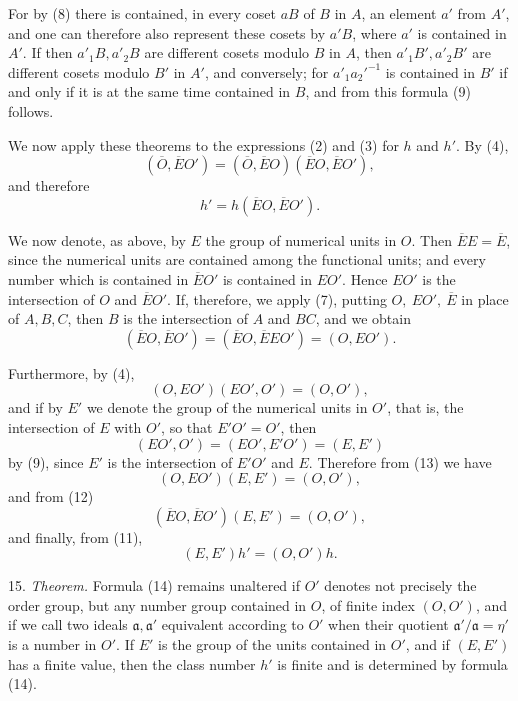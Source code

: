 \documentclass[11pt]{article}
\begin{document}
For by (8) there is contained, in every coset \(aB\) of \(B\) in \(A\), an element \(a'\) from \(A'\), and one can therefore also represent these cosets by \(a'B\), where \(a'\) is contained in \(A'\). If then \(a'_1B,a'_2B\) are different cosets modulo \(B\) in \(A\), then \(a'_1B',a'_2B'\) are different cosets modulo \(B'\) in \(A'\), and conversely; for \(a'_1a_2'^{-1}\) is contained in \(B'\) if and only if it is at the same time contained in \(B\), and from this formula (9) follows.

We now apply these theorems to the expressions (2) and (3) for \(h\) and \(h'\). By (4),
\begin{equation}
 (\overline O,\overline EO')=(\overline O,\overline EO)(\overline EO,\overline EO'),
\tag{10}
\end{equation}
and therefore
\begin{equation}
 h'=h(\overline EO,\overline EO').
\tag{11}
\end{equation}

We now denote, as above, by \(E\) the group of numerical units in \(O\). Then \(\overline EE=\overline E\), since the numerical units are contained among the functional units; and every number which is contained in \(\overline EO'\) is contained in \(EO'\). Hence \(EO'\) is the intersection of \(O\) and \(\overline EO'\). If, therefore, we apply (7), putting \(O,\ EO',\ \overline E\) in place of \(A,B,C\), then \(B\) is the intersection of \(A\) and \(BC\), and we obtain
\begin{equation}
 (\overline EO,\overline EO')=(\overline EO,\overline EEO')=(O,EO').
\tag{12}
\end{equation}

Furthermore, by (4),
\begin{equation}
 (O,EO')(EO',O')=(O,O'),
\tag{13}
\end{equation}
and if by \(E'\) we denote the group of the numerical units in \(O'\), that is, the intersection of \(E\) with \(O'\), so that \(E'O'=O'\), then
\[
 (EO',O')=(EO',E'O')=(E,E')
\]
by (9), since \(E'\) is the intersection of \(E'O'\) and \(E\). Therefore from (13) we have
\[
 (O,EO')(E,E')=(O,O'),
\]
and from (12)
\[
 (\overline EO,\overline EO')(E,E')=(O,O'),
\]
and finally, from (11),
\begin{equation}
 (E,E')h'=(O,O')h.
\tag{14}
\end{equation}

15. \emph{Theorem.} Formula (14) remains unaltered if \(O'\) denotes not precisely the order group, but any number group contained in \(O\), of finite index \((O,O')\), and if we call two ideals \(\mathfrak a,\mathfrak a'\) equivalent according to \(O'\) when their quotient \(\mathfrak a'/\mathfrak a=\eta'\) is a number in \(O'\). If \(E'\) is the group of the units contained in \(O'\), and if \((E,E')\) has a finite value, then the class number \(h'\) is finite and is determined by formula (14).
\end{document}
